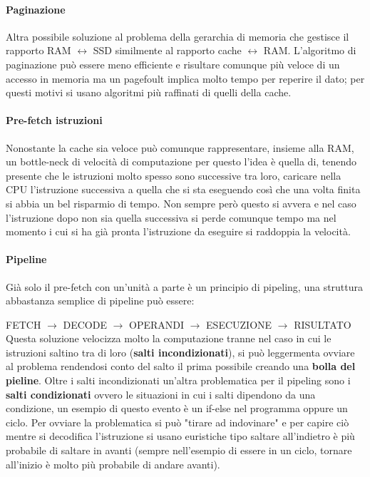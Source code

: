 \documentclass{article}
\begin{document}
\paragraph{Paginazione} Altra possibile soluzione al problema della gerarchia di memoria che gestisce il rapporto RAM $\leftrightarrow$ SSD similmente al rapporto cache $\leftrightarrow$ RAM. L'algoritmo di paginazione può essere meno efficiente e risultare comunque più veloce di un accesso in memoria ma un pagefoult implica molto tempo per reperire il dato; per questi motivi si usano algoritmi più raffinati di quelli della cache.

\paragraph{Pre-fetch istruzioni} Nonostante la cache sia veloce può comunque rappresentare, insieme alla RAM, un bottle-neck di velocità di computazione per questo l'idea è quella di, tenendo presente che le istruzioni molto spesso sono successive tra loro, caricare nella CPU l'istruzione successiva a quella che si sta eseguendo così che una volta finita si abbia un bel risparmio di tempo. Non sempre però questo si avvera e nel caso l'istruzione dopo non sia quella successiva si perde comunque tempo ma nel momento i cui si ha già pronta l'istruzione da eseguire si raddoppia la velocità.

\paragraph{Pipeline} Già solo il pre-fetch con un'unità a parte è un principio di pipeling, una struttura abbastanza semplice di pipeline può essere:

FETCH $\rightarrow$ DECODE $\rightarrow$ OPERANDI $\rightarrow$ ESECUZIONE $\rightarrow$ RISULTATO
Questa soluzione velocizza molto la computazione tranne nel caso in cui le istruzioni saltino tra di loro (\textbf{salti incondizionati}), si può leggermenta ovviare al problema rendendosi conto del salto il prima possibile creando una \textbf{bolla del pieline}. Oltre i salti incondizionati un'altra problematica per il pipeling sono i \textbf{salti condizionati} ovvero le situazioni in cui i salti dipendono da una condizione, un esempio di questo evento è un if-else nel programma oppure un ciclo. Per ovviare la problematica si può "tirare ad indovinare" e per capire ciò mentre si decodifica l'istruzione si usano euristiche tipo saltare all'indietro è più probabile di saltare in avanti (sempre nell'esempio di essere in un ciclo, tornare all'inizio è molto più probabile di andare avanti).
\end{document}
